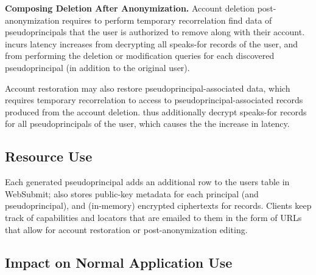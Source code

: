 \textbf{Composing Deletion After Anonymization.}
Account deletion post-anonymization requires \sys to perform temporary recorrelation find data of
pseudoprincipals that the user is authorized to remove along with their account. \sys incurs latency
increases from decrypting all speaks-for records of the user, and from performing the deletion or
modification queries for each discovered pseudoprincipal (in addition to the original user).

Account restoration may also restore pseudoprincipal-associated data, which requires temporary
recorrelation to access to pseudoprincipal-associated records produced from the account deletion.
\sys thus additionally decrypt speaks-for records for all pseudoprincipals of the user, which causes
the the increase in latency.

\subsection{Resource Use}
\label{s:eval-res}

Each generated pseudoprincipal adds an additional row to the users table in WebSubmit; \sys also
stores public-key metadata for each principal (and pseudoprincipal), and (in-memory) encrypted
ciphertexts for records.  Clients keep track of capabilities and locators that are emailed to them in
the form of URLs that allow for account restoration or post-anonymization editing.

\subsection{Impact on Normal Application Use}
\label{s:eval-conc}


